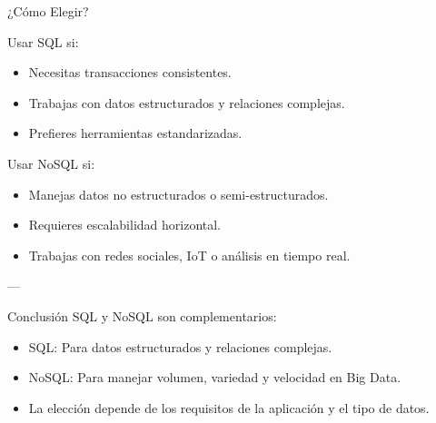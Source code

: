 \documentclass[presentation]{beamer}
\begin{document}
\begin{frame}[label={sec:org1a4e963}]{¿Cómo Elegir?}
\begin{block}{Usar SQL si:}
\begin{itemize}
\item Necesitas transacciones consistentes.
\item Trabajas con datos estructurados y relaciones complejas.
\item Prefieres herramientas estandarizadas.
\end{itemize}
\end{block}

\begin{block}{Usar NoSQL si:}
\begin{itemize}
\item Manejas datos no estructurados o semi-estructurados.
\item Requieres escalabilidad horizontal.
\item Trabajas con redes sociales, IoT o análisis en tiempo real.
\end{itemize}

---
\end{block}
\end{frame}

\begin{frame}[label={sec:org74b86f7}]{Conclusión}
SQL y NoSQL son complementarios:
\begin{itemize}
\item \alert{\alert{SQL}}: Para datos estructurados y relaciones complejas.
\item \alert{\alert{NoSQL}}: Para manejar volumen, variedad y velocidad en Big Data.
\item La elección depende de los requisitos de la aplicación y el tipo de datos.
\end{itemize}
\end{frame}
\end{document}
